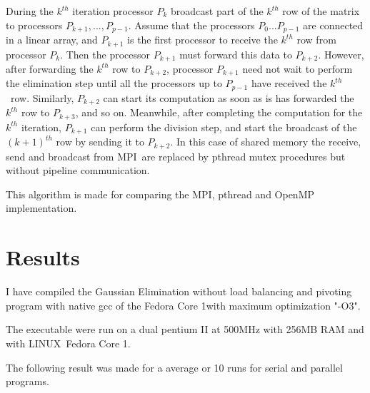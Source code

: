 \documentclass[a4paper]{article}
\begin{document}
During the $k^{th}$ iteration processor $P_{k}$ broadcast part of the $k^{th}
$ row of the matrix to processors $P_{k+1},...,P_{p-1}$. Assume that the
processors $P_{0}...P_{p-1}$ are connected in a linear array, and $P_{k+1}$
is the first processor to receive the $k^{th}$ row from processor $P_{k}$.
Then the processor $P_{k+1}$ must forward this data to $P_{k+2}$. However,
after forwarding the $k^{th}$ row to $P_{k+2}$, processor $P_{k+1}$ need not
wait to perform the elimination step until all the processors up to $P_{p-1}$
have received the $k^{th}\,$\ row. Similarly, $P_{k+2}$ can start its
computation as soon as is has forwarded the $k^{th}$ row to $P_{k+3}$, and
so on. Meanwhile, after completing the computation for the $k^{th}$
iteration, $P_{k+1}$ can perform the division step, and start the broadcast
of the $(k+1)^{th}$ row by sending it to $P_{k+2}$. In this case of shared
memory the receive, send and broadcast from MPI\ are replaced by pthread
mutex procedures but without pipeline communication.

This algorithm is made for comparing the MPI, pthread and OpenMP
implementation.

\section{Results}

I have compiled the Gaussian Elimination without load balancing and pivoting
program with native gcc of the Fedora Core 1with maximum optimization "-O3".

The executable were run on a dual pentium II at 500MHz with 256MB RAM and
with LINUX\ Fedora Core 1.

The following result was made for a average or 10 runs for serial and
parallel programs.

\begin{center}
\end{center}
\end{document}
